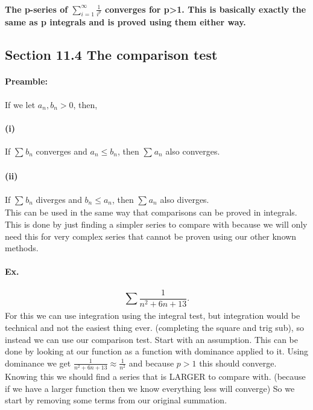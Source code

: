 \paragraph{The p-series of $ \sum_{ i=1 } ^{ \infty } \frac{ 1 }{ i^{ p } }  $ converges for p>1. This is basically exactly the same as p integrals and is proved using them either way.}

\subsection{Section 11.4 The comparison test}%
\label{sub:Section 11.4 The comparison test}
\paragraph{Preamble:}
If we let $ a_n,b_n >0 $, then,
\paragraph{(i)} If $ \sum_{  } ^{  } b_n $ converges and $ a_n \le b_n $, then $ \sum_{  } ^{  } a_n $ also converges. 
\paragraph{(ii)} If $ \sum_{  } ^{ } b_n $ diverges and $ b_n \le a_n $, then $ \sum_{  } ^{  } a_n $ also diverges. \\
This can be used in the same way that comparisons can be proved in integrals. This is done by just finding a simpler series to compare with because we will only need this for very complex series that cannot be proven using our other known methods. 

\paragraph{Ex.}
\[
\sum_{  } ^{  } \frac{ 1 }{ n^2+6n+13 } 
.\] 
For this we can use integration using the integral test, but integration would be technical and not the easiest thing ever. (completing the square and trig sub), so instead we can use our comparison test. Start with an assumption. This can be done by looking at our function as a function with dominance applied to it. Using dominance we get $ \frac{ 1 }{ n^2+6n+13 } \approx \frac{ 1 }{ n^2 }  $ and because $ p>1 $ this should converge. Knowing this we should find a series that is LARGER to compare with. (because if we have a larger function then we know everything less will converge) So we start by removing some terms from our original summation. \\

